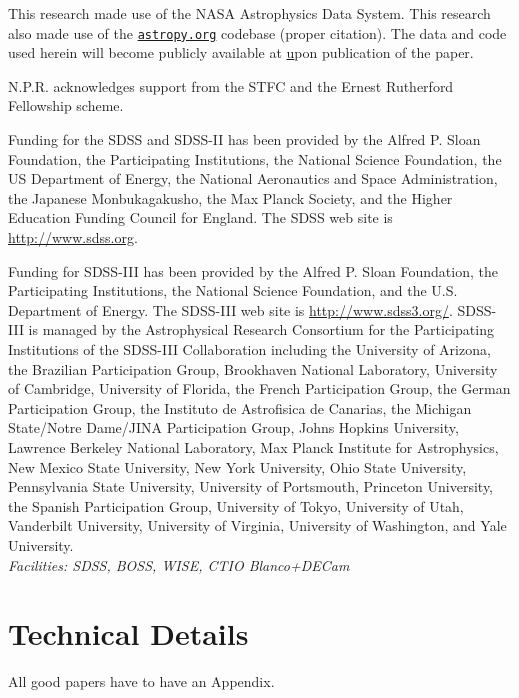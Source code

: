 \documentclass{emulateapj}
\begin{document}
This research made use of the NASA Astrophysics Data System.  This
research also made use of the \href{www.astropy.org}{\tt astropy.org}
codebase (proper citation).  The data and code used herein will become
publicly available at \href{\tt
http://www.legacysurvey.org/dr3/Extreme_wise_quasars/} upon
publication of the paper.

N.P.R. acknowledges support from the STFC and the Ernest Rutherford
Fellowship scheme.

Funding for the SDSS and SDSS-II has been provided by the Alfred
P. Sloan Foundation, the Participating Institutions, the National
Science Foundation, the US Department of Energy, the National
Aeronautics and Space Administration, the Japanese Monbukagakusho, the
Max Planck Society, and the Higher Education Funding Council for
England. The SDSS web site is
\href{http://www.sdss.org/}{http://www.sdss.org}.

Funding for SDSS-III has been provided by the Alfred P. Sloan
Foundation, the Participating Institutions, the National Science
Foundation, and the U.S. Department of Energy. The SDSS-III web site
is \href{http://www.sdss3.org/}{http://www.sdss3.org/}.  SDSS-III is
managed by the Astrophysical Research Consortium for the Participating
Institutions of the SDSS-III Collaboration including the University of
Arizona, the Brazilian Participation Group, Brookhaven National
Laboratory, University of Cambridge, University of Florida, the French
Participation Group, the German Participation Group, the Instituto de
Astrofisica de Canarias, the Michigan State/Notre Dame/JINA
Participation Group, Johns Hopkins University, Lawrence Berkeley
National Laboratory, Max Planck Institute for Astrophysics, New Mexico
State University, New York University, Ohio State University,
Pennsylvania State University, University of Portsmouth, Princeton
University, the Spanish Participation Group, University of Tokyo,
University of Utah, Vanderbilt University, University of Virginia,
University of Washington, and Yale University.  \\ {\it Facilities:
SDSS, BOSS, WISE, CTIO Blanco+DECam}



\clearpage
\appendix
\section{Technical Details}
All good papers have to have an Appendix. 
\end{document}
